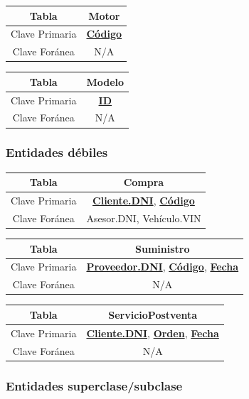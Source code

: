 \documentclass[12pt]{article}
\begin{document}
\begin{tabular}{|c|c|}
\hline
Tabla & Motor \\
\hline
Clave Primaria & \textbf{\underline{Código}} \\
\hline
Clave Foránea & N/A \\
\hline
\end{tabular}


\begin{tabular}{|c|c|}
\hline
Tabla & Modelo \\
\hline
Clave Primaria & \textbf{\underline{ID}} \\
\hline
Clave Foránea & N/A \\
\hline
\end{tabular}


\subsubsection{Entidades d\'ebiles}


\begin{tabular}{|c|c|}
\hline
Tabla & Compra \\
\hline
Clave Primaria & \textbf{\underline{Cliente.DNI}}, \textbf{\underline{Código}} \\
\hline
Clave Foránea & Asesor.DNI, Vehículo.VIN \\
\hline
\end{tabular}


\begin{tabular}{|c|c|}
\hline
Tabla & Suministro \\
\hline
Clave Primaria & \textbf{\underline{Proveedor.DNI}}, \textbf{\underline{Código}}, \textbf{\underline{Fecha}} \\
\hline
Clave Foránea & N/A \\
\hline
\end{tabular}


\begin{tabular}{|c|c|}
\hline
Tabla & ServicioPostventa \\
\hline
Clave Primaria & \textbf{\underline{Cliente.DNI}}, \textbf{\underline{Orden}}, \textbf{\underline{Fecha}} \\
\hline
Clave Foránea & N/A \\
\hline
\end{tabular}


\subsubsection{Entidades superclase/subclase}
\end{document}
